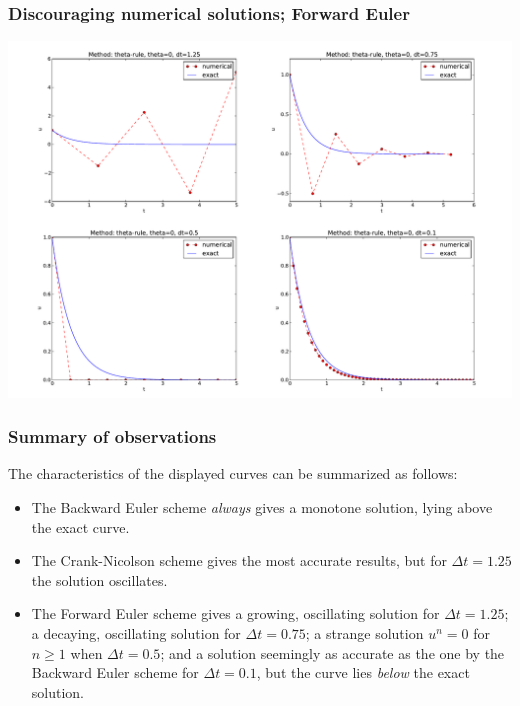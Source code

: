 \documentclass{beamer}
\begin{document}
\begin{frame}
\frametitle{Discouraging numerical solutions; Forward Euler}

\centerline{\includegraphics[width=1.1\linewidth]{fig-analysis/FE4c.pdf}}
\end{frame}

\begin{frame}
\frametitle{Summary of observations}

The characteristics of the displayed curves can be summarized as follows:

\begin{itemize}
  \item The Backward Euler scheme \emph{always} gives a monotone solution, lying above
    the exact curve.

  \item The Crank-Nicolson scheme gives the most accurate results, but for
    $\Delta t=1.25$ the solution oscillates.

  \item The Forward Euler scheme gives a growing, oscillating solution for
    $\Delta t=1.25$; a decaying, oscillating solution for $\Delta t=0.75$;
    a strange solution $u^n=0$ for $n\geq 1$ when $\Delta t=0.5$; and
    a solution seemingly as accurate as the one by the Backward Euler
    scheme for $\Delta t = 0.1$, but the curve lies \emph{below} the exact
    solution.
\end{itemize}

\noindent
\end{frame}
\end{document}
